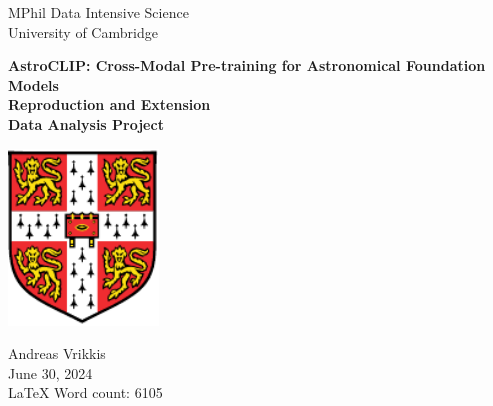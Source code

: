 \documentclass[a4paper,12pt]{article}
\begin{document}
    
    \vspace*{3cm}
    
    \begin{center}
     {\Large MPhil Data Intensive Science}  \\ [3pt]
     {\Large University of Cambridge}  \\ [3pt]
     
     \vspace*{1cm}
     \hrulefill
     \vspace*{0.75cm}
     
     {\LARGE \textbf{AstroCLIP: Cross-Modal Pre-training for Astronomical Foundation Models}} \\ [6pt]
     \large{\textbf{Reproduction and Extension}} \\ [6pt]
     \large \textbf{Data Analysis Project} \\ [6pt]
     \vspace*{0.05cm}
     \hrulefill
     \vspace*{1.5cm}

    \includegraphics[width=0.3\textwidth]{../figures/University_Crest.pdf} 

    \vspace*{1.5cm}
     
     {\Large  Andreas Vrikkis} \\ [6pt]
     {\large  June 30, 2024} \\ [3pt]
     {\large  \LaTeX \hspace{0.03cm} Word count: 6105 } \\ [3pt]
     
     \end{center}   
    
    
    \newpage
    
    \restoregeometry
    
\end{document}
